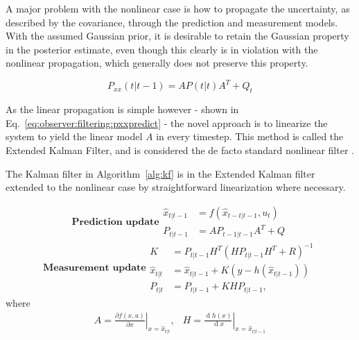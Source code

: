     A major problem with the nonlinear case is how to propagate the uncertainty,
    as described by the covariance, through the prediction and measurement models.
    With the assumed Gaussian prior, it is desirable to retain the Gaussian
    property in the posterior estimate, even though this clearly is in violation with the
    nonlinear propagation, which generally does not preserve this property.

    \begin{equation}
        \label{eq:observer:filtering:pxxpredict}
        P_{xx}(t|t-1) = AP(t|t)A^{T} + Q_{t}
    \end{equation}

    As the linear propagation is simple however - shown in Eq.~\eqref{eq:observer:filtering:pxxpredict} - the
    novel approach is to linearize the system to yield the linear model $A$ in every timestep.
    This method is called the Extended Kalman Filter, and is considered the
    de facto standard nonlinear filter \cite{Julier04nonlinear}.

    \begin{algorithm}
        \label{alg:ekf}
        The Kalman filter in Algorithm~\ref{alg:kf} is in the Extended Kalman filter extended to the
        nonlinear case by straightforward linearization where necessary.

        \begin{subequations}
            \textbf{Prediction update}
            \begin{align}
                \hat{x}_{t|t-1} &= f\left( \hat{x}_{t-t|t-1}, u_{t} \right) \\
                P_{t|t-1} &= A P_{t-1|t-1} A^{T} + Q
            \end{align}
        \end{subequations}
        \begin{subequations}\textbf{Measurement update}
            \begin{align}
                K &= P_{t|t-1} H^{T} \left( H P_{t|t-1} H^{T} + R \right)^{-1} \label{eq:filtering:kalmanK} \\
                \hat{x}_{t|t} &= \hat{x}_{t|t-1} + K \left( y - h(\hat{x}_{t|t-1}) \right) \\
                P_{t|t} &= P_{t|t-1} + K H P_{t|t-1},
            \end{align}
        \end{subequations}
        where
        \begin{equation}
            \begin{array}{cc}
                A = \left.\frac{\partial f(x,u)}{\partial x}\right|_{x = \hat{x}_{t|t}}, & H = \left.\frac{\operatorname{d}\!h(x)}{\operatorname{d}\!x}\right|_{x = \hat{x}_{t|t-1}}
            \end{array}
        \end{equation}
    \end{algorithm}

